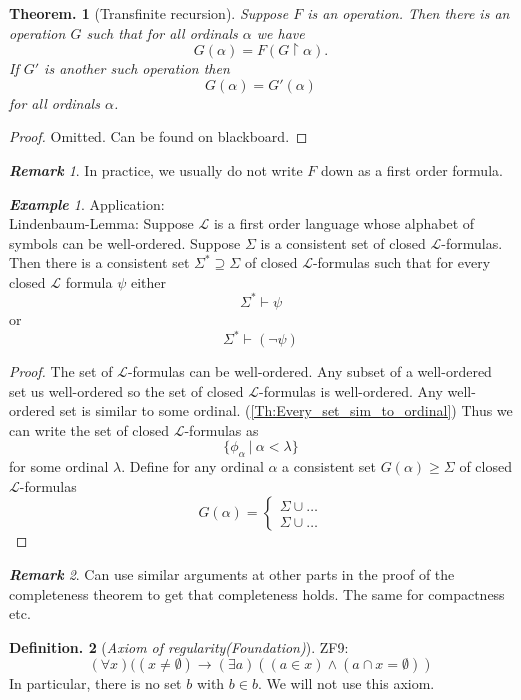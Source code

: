 \documentclass[a4paper,oneside,11pt,DIV=12,parskip=half]{scrartcl}
\newcommand{\LL}{\mathcal L}
\theoremstyle{plain}
\newtheorem{theorem}{Theorem.}[section]
\theoremstyle{definition}
\newtheorem{definition}[theorem]{Definition.}
\newtheorem{remark, definition}[theorem]{Remark and Definition.}
\newtheorem{lemma, definition}[theorem]{Lemma and Definition.}
\newtheorem{theorem, definition}[theorem]{Theorem and Definition.}
\theoremstyle{remark}
\newtheorem*{remark}{\textbf{Remark}}
\newtheorem*{example}{\textbf{Example}}
\newtheorem*{remark, example}{\textbf{Remark and Exercise}}
\begin{document}
\begin{theorem}[Transfinite recursion]
Suppose $F$ is an operation. Then there is an operation $G$ such that for all ordinals $\alpha$ we have
    \[ G(\alpha) = F(G\upharpoonright \alpha). \]
If $G'$ is another such operation then 
    \[ G(\alpha) = G'(\alpha) \]
for all ordinals $\alpha$.
\end{theorem}

\begin{proof}
Omitted. Can be found on blackboard.
\end{proof}

\begin{remark}
In practice, we usually do not write $F$ down as a first order formula.
\end{remark}

\begin{example}
Application:\\
Lindenbaum-Lemma:
Suppose $\LL$ is a first order language whose alphabet of symbols can be well-ordered. Suppose $\Sigma$ is a consistent set of closed $\LL$-formulas. Then there is a consistent set $\Sigma^* \supseteq \Sigma$ of closed $\LL$-formulas such that for every closed $\LL$ formula $\psi$ either
    \[ \Sigma^* \vdash \psi \]
or
    \[ \Sigma^* \vdash (\lnot \psi) \]

\begin{proof}
The set of $\LL$-formulas can be well-ordered. Any subset of a well-ordered set us well-ordered so the set of closed $\LL$-formulas is well-ordered. Any well-ordered set is similar to some ordinal. (\ref{Th:Every_set_sim_to_ordinal})
Thus we can write the set of closed $\LL$-formulas as
    \[ \{ \phi_\alpha ~|~ \alpha < \lambda \} \]
for some ordinal $\lambda$.
Define for any ordinal $\alpha$ a consistent set $G(\alpha) \geq \Sigma$ of closed $\LL$-formulas
\[ G(\alpha) = \begin{cases} \Sigma \cup \dots \\ \Sigma \cup \dots \end{cases} \]
\end{proof}
\end{example}

\begin{remark}
Can use similar arguments at other parts in the proof of the completeness theorem to get that completeness holds. The same for compactness etc.
\end{remark}

\begin{definition}[\emph{Axiom of regularity(Foundation)}]
ZF9: \[ (\forall x)((x \neq \emptyset) \rightarrow (\exists a)((a \in x) \land ( a \cap x = \emptyset)) \]
In particular, there is no set $b$ with $b \in b$. We will not use this axiom.
\end{definition}
\end{document}
